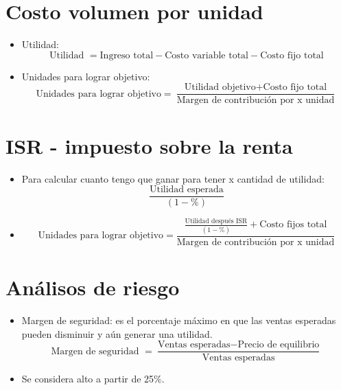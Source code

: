 
\section{Costo volumen por unidad}
\begin{itemize}
    \item Utilidad:  
    \[
      \text{Utilidad } = \text{Ingreso total} - \text{Costo variable total} - \text{Costo fijo total}
    \]
    
    \item Unidades para lograr objetivo: 
        \[
         \text{Unidades para lograr objetivo} = \frac{\text{Utilidad objetivo} + \text{Costo fijo total}}{\text{Margen de contribución por x unidad}} 
        \]
\end{itemize}

\section{ISR - impuesto sobre la renta}
\begin{itemize}
    \item Para calcular cuanto tengo que ganar para tener x cantidad de utilidad:
        \[
          \frac{\text{Utilidad esperada}}{(1-\%)} 
        \]
    
    \item 
        \[
          \text{Unidades para lograr objetivo} = \frac{\frac{\text{Utilidad después ISR}}{(1-\%)} + \text{Costo fijos total}}{\text{Margen de contribución por x unidad}} 
        \]
\end{itemize}

\section{Análisos de riesgo}
\begin{itemize}
    \item Margen de seguridad: es el porcentaje máximo en que las ventas esperadas pueden disminuir y aún generar una utilidad.
        \[
          \text{Margen de seguridad } = \frac{\text{Ventas esperadas} - \text{Precio de equilibrio}}{\text{Ventas esperadas}} 
        \]
    
    \item Se considera alto a partir de 25\%. 
\end{itemize}

